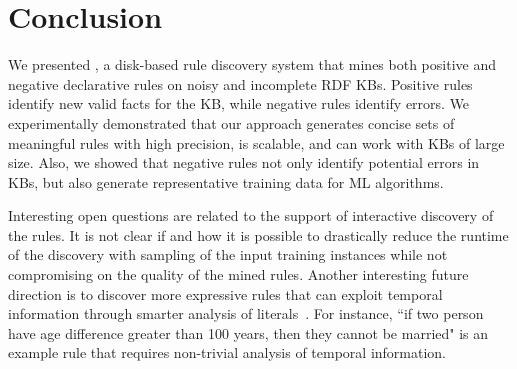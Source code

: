 \section{Conclusion}
We presented \krd, a disk-based rule discovery system that mines both positive and negative declarative rules on noisy and incomplete RDF KBs. Positive rules identify new valid facts for the KB, while negative rules identify errors. 
We experimentally demonstrated that our approach generates concise sets of meaningful rules with high precision,
is scalable, and can work with KBs of large size. 
Also, we showed that negative rules not only identify potential errors in KBs, but also generate representative training data for ML algorithms.

Interesting open questions are related to the support of interactive discovery of the rules. It is not clear if and how it is possible to drastically reduce the runtime of the discovery with sampling of the input training instances while not compromising on the quality of the mined rules. 
Another interesting future direction is to discover more expressive rules that can exploit temporal information through smarter analysis of literals~\cite{abedjan2015temporal}. For instance, ``if two person have age difference greater than 100 years, then they cannot be married" is an example rule that requires non-trivial analysis of temporal information. 


